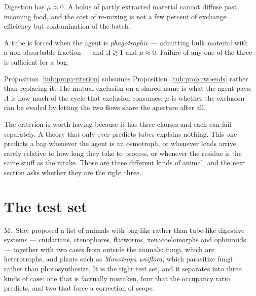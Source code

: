 Digestion has $\mu \approx 0$. A bolus of partly extracted material cannot
diffuse past incoming food, and the cost of re-mixing is not a few percent of
exchange efficiency but contamination of the batch.

\begin{proposition}
\label{tub:prop:criterion}
A tube is forced when the agent is \emph{phagotrophic} --- admitting bulk
material with a non-absorbable fraction --- and $\Lambda \gtrsim 1$ and
$\mu \approx 0$. Failure of any one of the three is sufficient for a bag.
\end{proposition}

Proposition~\ref{tub:prop:criterion} subsumes
Proposition~\ref{tub:prop:twoends} rather than replacing it. The mutual
exclusion on a shared name is what the agent pays; $\Lambda$ is how much of the
cycle that exclusion consumes; $\mu$ is whether the exclusion can be evaded by
letting the two flows share the aperture after all.

The criterion is worth having because it has three clauses and each can fail
separately. A theory that only ever predicts tubes explains nothing. This one
predicts a bag whenever the agent is an osmotroph, or whenever loads arrive
rarely relative to how long they take to process, or whenever the residue is the
same stuff as the intake. Those are three different kinds of animal, and the next
section asks whether they are the right three.

\section{The test set}
\label{tub:sec:testset}

M.~Stay proposed a list of animals with bag-like rather than tube-like digestive
systems --- cnidarians, ctenophores, flatworms, xenacoelomorphs and ophiuroids
--- together with two cases from outside the animals: fungi, which are
heterotrophs, and plants such as \emph{Monotropa uniflora}, which parasitize
fungi rather than photosynthesize. It is the right test set, and it separates
into three kinds of case: one that is factually mistaken, four that the
occupancy ratio predicts, and two that force a correction of scope.

